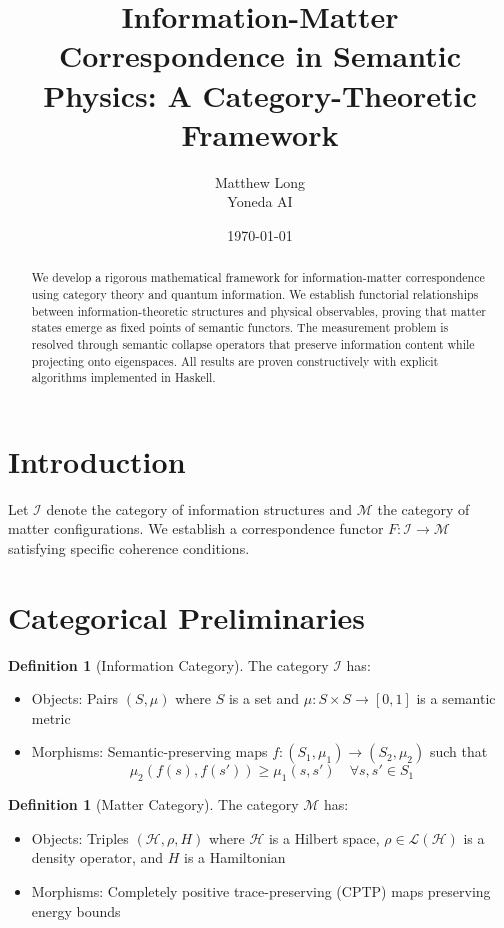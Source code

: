 \documentclass[12pt,a4paper]{article}
\title{Information-Matter Correspondence in Semantic Physics: A Category-Theoretic Framework}
\author{Matthew Long\\Yoneda AI}
\date{\today}
\theoremstyle{plain}
\theoremstyle{definition}
\newtheorem{definition}[theorem]{Definition}
\newcommand{\Hil}{\mathcal{H}}
\newcommand{\Info}{\mathcal{I}}
\newcommand{\Matter}{\mathcal{M}}
\begin{document}
\maketitle

\begin{abstract}
We develop a rigorous mathematical framework for information-matter correspondence using category theory and quantum information. We establish functorial relationships between information-theoretic structures and physical observables, proving that matter states emerge as fixed points of semantic functors. The measurement problem is resolved through semantic collapse operators that preserve information content while projecting onto eigenspaces. All results are proven constructively with explicit algorithms implemented in Haskell.
\end{abstract}

\section{Introduction}

Let $\Info$ denote the category of information structures and $\Matter$ the category of matter configurations. We establish a correspondence functor $F: \Info \to \Matter$ satisfying specific coherence conditions.

\section{Categorical Preliminaries}

\begin{definition}[Information Category]
The category $\Info$ has:
\begin{itemize}
\item Objects: Pairs $(S, \mu)$ where $S$ is a set and $\mu: S \times S \to [0,1]$ is a semantic metric
\item Morphisms: Semantic-preserving maps $f: (S_1, \mu_1) \to (S_2, \mu_2)$ such that
\[
\mu_2(f(s), f(s')) \geq \mu_1(s, s') \quad \forall s, s' \in S_1
\]
\end{itemize}
\end{definition}

\begin{definition}[Matter Category]
The category $\Matter$ has:
\begin{itemize}
\item Objects: Triples $(\Hil, \rho, H)$ where $\Hil$ is a Hilbert space, $\rho \in \mathcal{L}(\Hil)$ is a density operator, and $H$ is a Hamiltonian
\item Morphisms: Completely positive trace-preserving (CPTP) maps preserving energy bounds
\end{itemize}
\end{definition}
\end{document}
